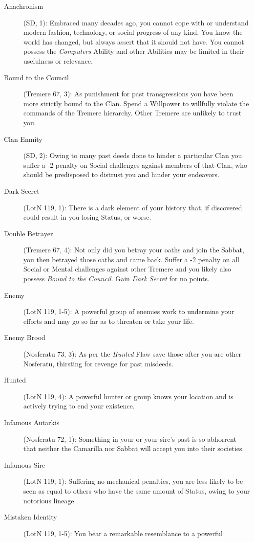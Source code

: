 \begin{description}
	\item[Anachronism] (SD, 1):  Embraced many decades ago, you cannot cope with or 
	understand modern fashion, technology, or social progress of any kind.  You know the world 
	has changed, but always assert that it should not have.  You cannot possess the \emph{Computers} 
	Ability and other Abilities may be limited in their usefulness or relevance.
	\item[Bound to the Council] (Tremere 67, 3):  As punishment for past transgressions you have 
	been more strictly bound to the Clan.  Spend a Willpower to willfully violate the commands of 
	the Tremere hierarchy.  Other Tremere are unlikely to trust you.
	\item[Clan Enmity] (SD, 2):  Owing to many past deeds done to hinder a particular Clan you 
	suffer a -2 penalty on Social challenges against members of that Clan, who should be predisposed 
	to distrust you and hinder your endeavors.
	\item[Dark Secret] (LotN 119, 1):  There is a dark element of your history that, if discovered 
	could result in you losing Status, or worse.
	\item[Double Betrayer] (Tremere 67, 4):  Not only did you betray your oaths and join the Sabbat, 
	you then betrayed those oaths and came back.  Suffer a -2 penalty on all Social or Mental challenges 
	against other Tremere and you likely also possess \emph{Bound to the Council}.  Gain \emph{Dark Secret} 
	for no points.
	\item[Enemy] (LotN 119, 1-5):  A powerful group of enemies work to undermine your efforts and 
	may go so far as to threaten or take your life.
	\item[Enemy Brood] (Nosferatu 73, 3):  As per the \emph{Hunted} Flaw save those after you are 
	other Nosferatu, thirsting for revenge for past misdeeds.
	\item[Hunted] (LotN 119, 4):  A powerful hunter or group knows your location and is actively 
	trying to end your existence.
	\item[Infamous Autarkis] (Nosferatu 72, 1):  Something in your or your sire's past is so 
	abhorrent that neither the Camarilla nor Sabbat will accept you into their societies.
	\item[Infamous Sire] (LotN 119, 1):  Suffering no mechanical penalties, you are less likely 
	to be seen as equal to others who have the same amount of Status, owing to your notorious lineage.
	\item[Mistaken Identity] (LotN 119, 1-5):  You bear a remarkable resemblance to a powerful 

\end{description}
